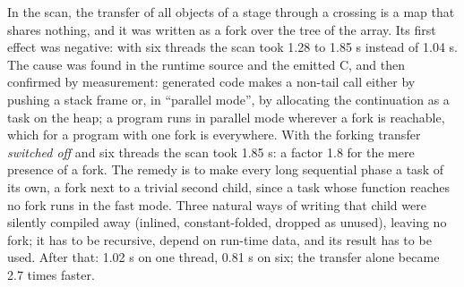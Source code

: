 In the scan, the transfer of all objects of a stage through a crossing is a
map that shares nothing, and it was written as a fork over the tree of the
array. Its first effect was negative: with six threads the scan took 1.28 to
1.85 s instead of 1.04 s. The cause was found in the runtime source and the
emitted C, and then confirmed by measurement: generated code makes a non-tail
call either by pushing a stack frame or, in ``parallel mode'', by allocating
the continuation as a task on the heap; a program runs in parallel mode
wherever a fork is reachable, which for a program with one fork is
everywhere. With the forking transfer \emph{switched off} and six threads the
scan took 1.85 s: a factor 1.8 for the mere presence of a fork. The remedy is
to make every long sequential phase a task of its own, a fork next to a
trivial second child, since a task whose function reaches no fork runs in the
fast mode. Three natural ways of writing that child were silently compiled
away (inlined, constant-folded, dropped as unused), leaving no fork; it has to
be recursive, depend on run-time data, and its result has to be used. After
that: 1.02 s on one thread, 0.81 s on six; the transfer alone became 2.7 times
faster.

